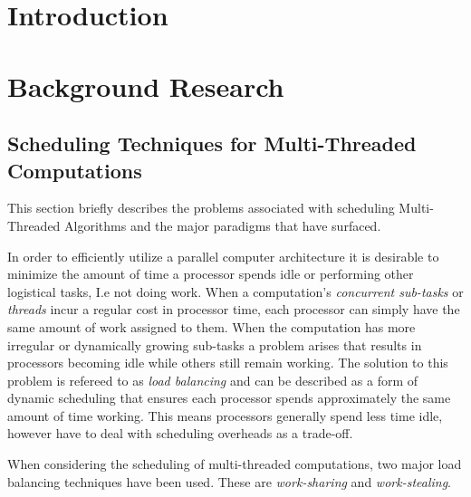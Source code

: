 \chapter{Introduction}

\chapter{Background Research}
\section{Scheduling Techniques for Multi-Threaded Computations}
This section briefly describes the problems associated with scheduling Multi-Threaded Algorithms and 
the major paradigms that have surfaced.

In order to efficiently utilize a parallel computer architecture it is desirable to minimize
the amount of time a processor spends idle or performing other logistical tasks, I.e not doing work. 
When a computation's \textit{concurrent sub-tasks} or \textit{threads} incur a regular cost in processor
time, each processor can simply have the same amount of work assigned to them. When the computation has
more irregular or dynamically growing sub-tasks a problem arises that results in 
processors becoming idle while others still remain working. The solution to this problem is refereed to as
\textit{load balancing} and can be described as a form of dynamic scheduling that ensures each processor 
spends approximately the same amount of time working. This means processors generally spend
less time idle, however have to deal with scheduling overheads as a trade-off.

When considering the scheduling of multi-threaded computations, two major load balancing techniques have been used.
These are \textit{work-sharing} and \textit{work-stealing}.

